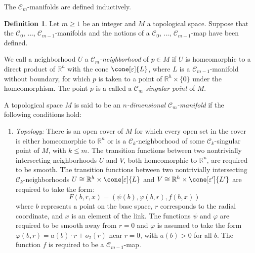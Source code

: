 \documentclass[12pt, reqno]{amsart}
\theoremstyle{plain} %
\theoremstyle{definition}
\newtheorem{definition}[theorem]{Definition}
\theoremstyle{remark}
\numberwithin{equation}{section}
\newcommand{\cat}[1]{\mathcal{#1}}
\newcommand{\field}[1]{\mathbb{#1}}
\newcommand{\R}{\field{R}}
\newcommand{\hdim}{h} %
\newcommand{\tdim}{n} %
\begin{document}
The \(\cat{C}_m\)-manifolds are defined inductively.
\begin{definition}
    Let \(m \geq 1\) be an integer and \(M\) a topological space.
    Suppose that the \(\cat{C}_0\), ..., \(\cat{C}_{m-1}\)-manifolds and the notions of a \(\cat{C}_0\), ..., \(\cat{C}_{m-1}\)-map have been defined.

    We call a neighborhood \(U\) a \textit{\(\cat{C}_m\)-neighborhood} of \(p \in M\) if \(U\) is homeomorphic to a direct product of \(\R^\hdim\) with the cone \(\cone[\varepsilon]{L}\), where \(L\) is a \(\cat{C}_{m-1}\)-manifold without boundary, for which \(p\) is taken to a point of \(\R^\hdim \times \{0\}\) under the homeomorphism.
    The point \(p\) is a called a \textit{\(\cat{C}_m\)-singular point} of \(M\).

    A topological space \(M\) is said to be an \textit{\(\tdim\)-dimensional \(\cat{C}_m\)-manifold} if the following conditions hold:
    \begin{enumerate}[label=(\alph*)]
        \item \emph{Topology:} There is an open cover of \(M\) for which every open set in the cover is either homeomorphic to \(\R^\tdim\) or is a \(\cat{C}_k\)-neighborhood of some \(\cat{C}_k\)-singular point of \(M\), with \(k \leq m\).
        The transition functions between two nontrivially intersecting neighborhoods \(U\) and \(V\), both homeomorphic to \(\R^\tdim\), are required to be smooth.
        The transition functions between two nontrivially intersecting \(\cat{C}_k\)-neighborhoods \(U \cong \R^\hdim \times \cone[\varepsilon]{L}\) and \(V \cong \R^\hdim \times \cone[\varepsilon']{L'}\) are required to take the form:
        \begin{equation*}
            F(b,r,x) = (\psi(b), \varphi(b,r), f(b,x))
        \end{equation*}
        where \(b\) represents a point on the base space, \(r\) corresponds to the radial coordinate, and \(x\) is an element of the link.
        The functions \(\psi\) and \(\varphi\) are required to be smooth away from \(r=0\) and \(\varphi\) is assumed to take the form \(\varphi(b,r) = a(b) \cdot r + o_2(r)\) near \(r=0\), with \(a(b) > 0\) for all \(b\).
        The function \(f\) is required to be a \(\cat{C}_{m-1}\)-map.


\end{enumerate}
\end{definition}
\end{document}
